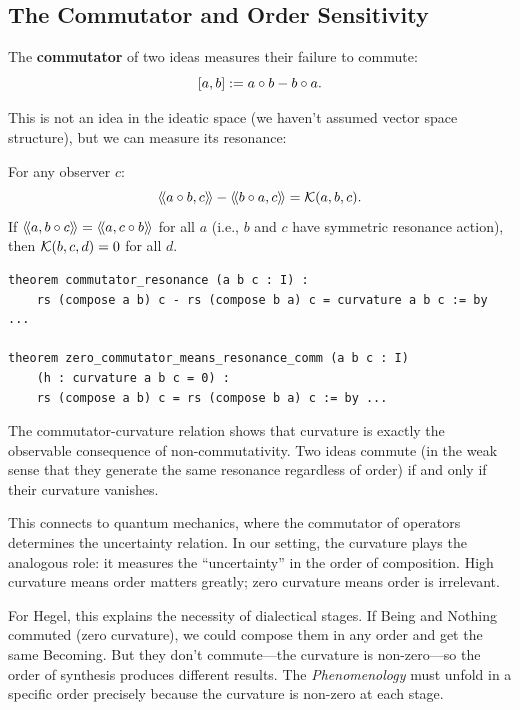 \subsection{The Commutator and Order Sensitivity}

The \textbf{commutator} of two ideas measures their failure to commute:
\[
  [a, b] := a \circ b - b \circ a.
\]

This is not an idea in the ideatic space (we haven't assumed vector space structure),
but we can measure its resonance:

\begin{theorem}
\label{thm:commutator-resonance}
For any observer $c$:
\[
  \langle\!\langle a \circ b, c \rangle\!\rangle - \langle\!\langle b \circ a, c \rangle\!\rangle = \mathcal{K}(a, b, c).
\]
If $\langle\!\langle a, b \circ c \rangle\!\rangle = \langle\!\langle a, c \circ b \rangle\!\rangle$ for all $a$ (i.e., $b$ and $c$
have symmetric resonance action), then $\mathcal{K}(b, c, d) = 0$ for all $d$.
\end{theorem}

\begin{lstlisting}[caption={Commutator and curvature (IDT\_v3\_Emergence.lean)}]
theorem commutator_resonance (a b c : I) :
    rs (compose a b) c - rs (compose b a) c = curvature a b c := by ...
    
theorem zero_commutator_means_resonance_comm (a b c : I)
    (h : curvature a b c = 0) :
    rs (compose a b) c = rs (compose b a) c := by ...
\end{lstlisting}

\begin{interpretation}
The commutator-curvature relation shows that curvature is exactly the observable
consequence of non-commutativity. Two ideas commute (in the weak sense that
they generate the same resonance regardless of order) if and only if their
curvature vanishes.

This connects to quantum mechanics, where the commutator of operators determines
the uncertainty relation. In our setting, the curvature plays the analogous
role: it measures the ``uncertainty'' in the order of composition. High
curvature means order matters greatly; zero curvature means order is irrelevant.

For Hegel, this explains the necessity of dialectical stages. If Being and
Nothing commuted (zero curvature), we could compose them in any order and get
the same Becoming. But they don't commute---the curvature is non-zero---so the
order of synthesis produces different results. The \emph{Phenomenology} must
unfold in a specific order precisely because the curvature is non-zero at each
stage.
\end{interpretation}

